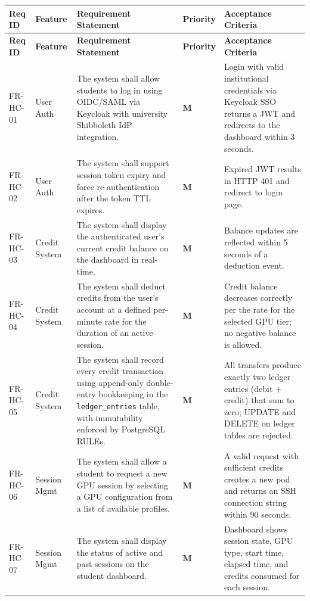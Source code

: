 \documentclass[12pt,a4paper]{article}
\newcommand{\Must}{\textcolor{dangered}{\textbf{M}}}
\begin{document}
\begin{longtable}{@{}L{2.1cm}L{1.8cm}L{5cm}C{1.4cm}L{5cm}@{}}
  
    \textbf{Req ID} & \textbf{Feature} & \textbf{Requirement Statement} & \textbf{Priority} & \textbf{Acceptance Criteria} \\
  \midrule
  \endfirsthead
  
    \textbf{Req ID} & \textbf{Feature} & \textbf{Requirement Statement} & \textbf{Priority} & \textbf{Acceptance Criteria} \\
  \midrule
  \endhead
  
  \endfoot

  FR-HC-01 & User Auth & The system shall allow students to log in using OIDC/SAML via Keycloak with university Shibboleth IdP integration. & \Must & Login with valid institutional credentials via Keycloak SSO returns a JWT and redirects to the dashboard within 3 seconds. \\
    FR-HC-02 & User Auth & The system shall support session token expiry and force re-authentication after the token TTL expires. & \Must & Expired JWT results in HTTP 401 and redirect to login page. \\
  FR-HC-03 & Credit System & The system shall display the authenticated user's current credit balance on the dashboard in real-time. & \Must & Balance updates are reflected within 5 seconds of a deduction event. \\
    FR-HC-04 & Credit System & The system shall deduct credits from the user's account at a defined per-minute rate for the duration of an active session. & \Must & Credit balance decreases correctly per the rate for the selected GPU tier; no negative balance is allowed. \\
  FR-HC-05 & Credit System & The system shall record every credit transaction using append-only double-entry bookkeeping in the \texttt{ledger\_entries} table, with immutability enforced by PostgreSQL RULEs. & \Must & All transfers produce exactly two ledger entries (debit + credit) that sum to zero; UPDATE and DELETE on ledger tables are rejected. \\
    FR-HC-06 & Session Mgmt & The system shall allow a student to request a new GPU session by selecting a GPU configuration from a list of available profiles. & \Must & A valid request with sufficient credits creates a new pod and returns an SSH connection string within 90 seconds. \\
  FR-HC-07 & Session Mgmt & The system shall display the status of active and past sessions on the student dashboard. & \Must & Dashboard shows session state, GPU type, start time, elapsed time, and credits consumed for each session. \\

\end{longtable}
\end{document}
